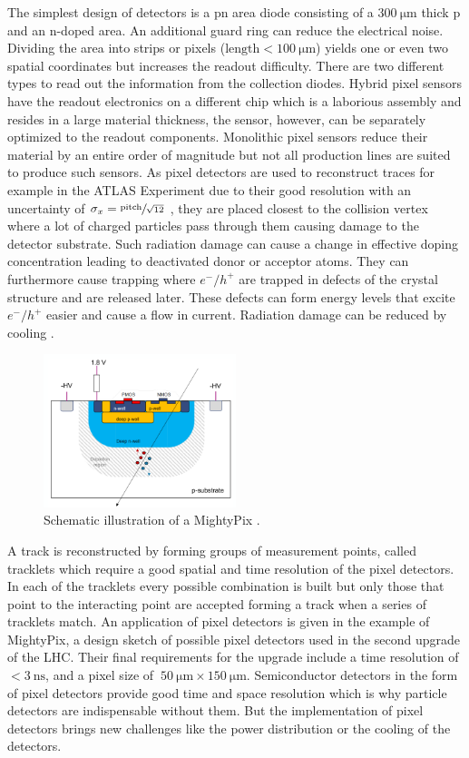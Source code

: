 The simplest design of detectors is a pn area diode consisting of a $\SI{300}{\micro\meter}$ thick p and an n-doped area.
An additional guard ring can reduce the electrical noise.
Dividing the area into strips or pixels ($\text{length}<\SI{100}{\micro\meter}$) yields one or even two spatial coordinates but increases the readout difficulty.
There are two different types to read out the information from the collection diodes.
Hybrid pixel sensors have the readout electronics on a different chip which is a laborious assembly and resides in a large material thickness, the sensor, however, can be separately optimized to the readout components.
Monolithic pixel sensors reduce their material by an entire order of magnitude but not all production lines are suited to produce such sensors.
As pixel detectors are used to reconstruct traces for example in the ATLAS Experiment due to their good resolution with an uncertainty of $\sigma_x=\sfrac{\text{pitch}}{\sqrt{12}}$ \cite{Tom}, they are placed closest to the collision vertex where a lot of charged particles pass through them causing damage to the detector substrate.
Such radiation damage can cause a change in effective doping concentration leading to deactivated donor or acceptor atoms.
They can furthermore cause trapping where $e^-/h^+$ are trapped in defects of the crystal structure and are released later.
These defects can form energy levels that excite $e^-/h^+$ easier and cause a flow in current.
Radiation damage can be reduced by cooling \cite{Tom}.
\begin{figure}
    \centering
    \includegraphics[width=0.5\textwidth]{figs/MightyPix.png}
    \caption{Schematic illustration of a MightyPix \cite{MightyPix}.}
    \label{fig:MightyPix}
\end{figure}
A track is reconstructed by forming groups of measurement points, called tracklets which require a good spatial and time resolution of the pixel detectors.
In each of the tracklets every possible combination is built but only those that point to the interacting point are accepted forming a track when a series of tracklets match.
An application of pixel detectors is given in the example of MightyPix, a design sketch of possible pixel detectors used in the second upgrade of the LHC.
Their final requirements for the upgrade include a time resolution of $<\SI{3}{\nano\second}$, and a pixel size of $~\SI{50}{\micro\meter}\times\SI{150}{\micro\meter}$.
Semiconductor detectors in the form of pixel detectors provide good time and space resolution which is why particle detectors are indispensable without them.
But the implementation of pixel detectors brings new challenges like the power distribution or the cooling of the detectors.
